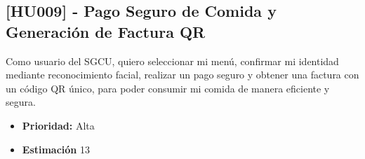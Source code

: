 \documentclass[12pt]{article}
\begin{document}
\pagebreak

\subsection{[HU009] - Pago Seguro de Comida y Generación de Factura QR}

Como usuario del SGCU, quiero seleccionar mi menú, confirmar mi identidad mediante reconocimiento facial, realizar un pago seguro y obtener una factura con un código QR único, para poder consumir mi comida de manera eficiente y segura.

\begin{itemize}
	\item \textbf{Prioridad:} Alta
	\item \textbf{Estimación} 13
\end{itemize}
\end{document}

